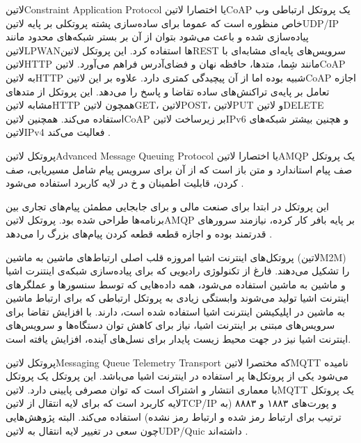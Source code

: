 
‌لاتین{Constraint Application Protocol} یا اختصارا ‌لاتین{CoAP}
یک پروتکل ارتباطی وب خاص منظوره است که عموما برای ساده‌سازی پشته پروتکلی بر پایه ‌لاتین{UDP/IP} پیاده‌سازی شده
و باعث می‌شود بتوان از آن بر بستر شبکه‌های محدود مانند ‌لاتین{LPWAN}ها استفاده کرد.
این پروتکل ‌لاتین{REST} سرویس‌های پایه‌ای مشابه‌ای با ‌لاتین{HTTP} مانند شِما، متدها، حافظه نهان و فضای‌آدرس فراهم می‌آورد.
‌لاتین{CoAP} به ‌لاتین{HTTP} شبیه بوده اما از آن پیچیدگی کمتری دارد.
علاوه بر این ‌لاتین{CoAP} اجازه تعامل بر پایه‌ی تراکنش‌های ساده تقاضا و پاسخ را می‌دهد.
این پروتکل از متدهای مشابه ‌لاتین{HTTP} همچون ‌لاتین{GET}، ‌لاتین{POST}، ‌لاتین{PUT} و ‌لاتین{DELETE} استفاده می‌کند.
همچنین ‌لاتین{CoAP} بر زیرساخت ‌لاتین{IPv6} و هچنین بیشتر شبکه‌های ‌لاتین{IPv4} فعالیت می‌کند
.


پروتکل ‌لاتین{Advanced Message Queuing Protocol} یا اختصارا ‌لاتین{AMQP} یک پروتکل صف پیام استاندارد و متن باز است
که از آن برای سرویس پیام شامل مسیریابی، صف کردن، قابلیت اطمینان و ‌خ در لایه کاربرد استفاده می‌شود
.

این پروتکل در ابتدا برای صنعت مالی و برای جابجایی مطمئن پیام‌های تجاری بین برنامه‌ها طراحی شده بود.
پروتکل ‌لاتین{AMQP} بر پایه بافر کار کرده، نیازمند سرورهای قدرتمند بوده و اجازه قطعه قطعه کردن پیام‌های بزرگ را می‌دهد
.


پروتکل‌های اینترنت اشیا امروزه قلب اصلی ارتباط‌های ماشین به ماشین (‌لاتین{M2M}) را تشکیل می‌دهند. فارغ از تکنولوژی رادیویی که برای پیاده‌سازی شبکه‌ی اینتنرت اشیا و ماشین به ماشین استفاده می‌شود، همه داده‌هایی که توسط سنسورها و عملگرهای اینترنت اشیا
تولید می‌شوند وابستگی زیادی به پروتکل ارتباطی که برای ارتباط ماشین به ماشین در اپلیکیشن اینترنت اشیا استفاده شده است، دارند.
با افزایش تقاضا برای سرویس‌های مبتنی بر اینترنت اشیا، نیاز برای کاهش توان دستگاه‌ها و سرویس‌های اینترنت اشیا نیز در جهت محیط زیست پایدار برای نسل‌های آینده، افزایش یافته است.

پروتکل ‌لاتین{Messaging Queue Telemetry Transport} که مختصرا ‌لاتین{MQTT} نامیده می‌شود یکی از پروتکل‌ها پر استفاده در اینترنت اشیا می‌باشد.
این پروتکل یک پروتکل با معماری انتشار و اشتراک است که توان مصرفی پایینی دارد.
‌لاتین{MQTT} یک پروتکل لایه کاربرد است که برای لایه انتقال از ‌لاتین{TCP/IP} و پورت‌های ۱۸۸۳ و ۸۸۸۳ (به ترتیب برای ارتباط رمز شده و ارتباط رمز نشده) استفاده می‌کند. البته پژوهش‌هایی چون  سعی در تغییر لایه انتقال به ‌لاتین{UDP/Quic} داشته‌اند
.

